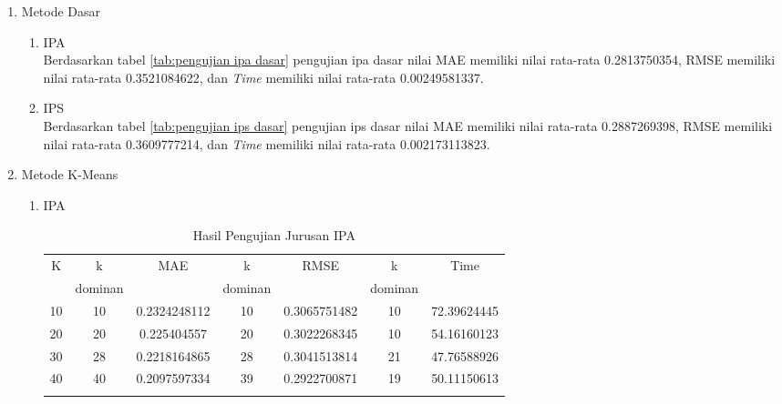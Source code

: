 \begin{enumerate}
    \item Metode Dasar 
        \begin{enumerate}
            \item IPA \\
                Berdasarkan tabel \ref{tab:pengujian ipa dasar} pengujian ipa dasar nilai MAE memiliki nilai rata-rata 0.2813750354, RMSE memiliki nilai rata-rata 0.3521084622, dan \textit{Time} memiliki nilai rata-rata 0.00249581337.
            
            \item IPS \\
                Berdasarkan tabel \ref{tab:pengujian ips dasar} pengujian ips dasar nilai MAE memiliki nilai rata-rata 0.2887269398, RMSE memiliki nilai rata-rata 0.3609777214, dan \textit{Time} memiliki nilai rata-rata 0.002173113823.
                
        \end{enumerate}
    
    \item Metode K-Means
        \begin{enumerate}
            \item IPA
                \begingroup
                    \renewcommand\arraystretch{1.5}
                    \begin{longtable}{|c|c|c|c|c|c|c|}
                        \hline
                        \multirow{2}{*}{K} & k & MAE & k & RMSE & k & Time \\
                        & dominan & & dominan & & dominan & \\
                        \hline
                        10 & 10 & 0.2324248112 & 10 & 0.3065751482 & 10 & 72.39624445\\
                        \hline
                        20 & 20 & 0.225404557 & 20 & 0.3022268345 & 10 & 54.16160123\\
                        \hline
                        30 & 28 & 0.2218164865 & 28 & 0.3041513814 & 21 & 47.76588926\\
                        \hline
                        40 & 40 & 0.2097597334 & 39 & 0.2922700871 & 19	 & 50.11150613\\
                        \hline
                        
                        \caption{Hasil Pengujian Jurusan IPA}
                        \label{tab:hasil pengujian ipa}
                    \end{longtable}
                \endgroup
                

\end{enumerate}
\end{enumerate}
